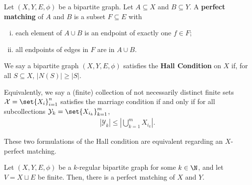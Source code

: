 \begin{definition}
  Let $\left(X,Y,E,\phi\right)$ be a bipartite graph. Let $A\subseteq X$ and $B\subseteq Y$. A \textbf{perfect matching} of $A$ and $B$ is a subset $F\subseteq E$ with
  \begin{enumerate}[(i)]
    \item each element of $A\cup B$ is an endpoint of exactly one $f\in F$;
    \item all endpoints of edges in $F$ are in $A\cup B$.
  \end{enumerate}
\end{definition}
\begin{definition}
  We say a bipartite graph $\left(X,Y,E,\phi\right)$ satisfies the \textbf{Hall Condition} on $X$ if, for all $S\subseteq X$, $\left\vert N(S) \right\vert \geq \left\vert S \right\vert$.\newline

  Equivalently, we say a (finite) collection of not necessarily distinct finite sets $\mathcal{X} = \set{X_i}_{i=1}^{n}$ satisfies the marriage condition if and only if for all subcollections $\mathcal{Y}_k = \set{X_{i_k}}_{k=1}^{m}$,
  \begin{align*}
    \left\vert \mathcal{Y}_k \right\vert \leq \left\vert \bigcup_{k=1}^{m}X_{i_k} \right\vert.
  \end{align*}
\end{definition}
\begin{remark}
These two formulations of the Hall condition are equivalent regarding an $X$-perfect matching.
\end{remark}
\begin{theorem}\label{thm:hall_finite}
  Let $\left(X,Y,E,\phi\right)$ be a $k$-regular bipartite graph for some $k\in \N$, and let $V = X\sqcup E$ be finite. Then, there is a perfect matching of $X$ and $Y$.
\end{theorem}
